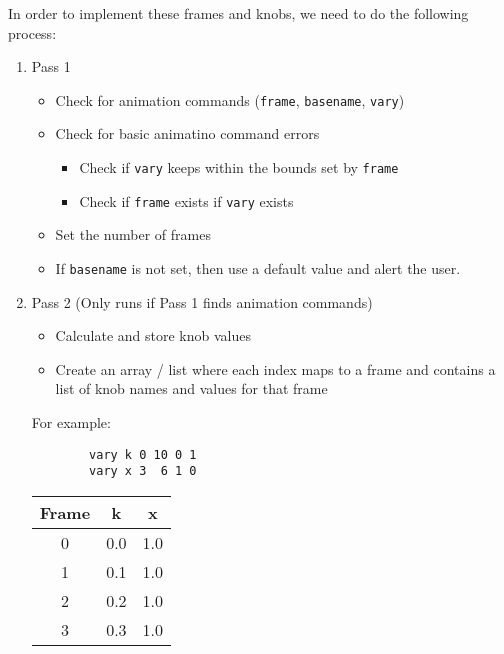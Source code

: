 \documentclass[11pt,fleqn]{article}
\theoremstyle{definition}
\begin{document}
In order to implement these frames and knobs, we need to do the following process:
\begin{enumerate}
    \item Pass 1
        \begin{itemize}
            \item Check for animation commands (\texttt{frame}, \texttt{basename},
                \texttt{vary})
            \item Check for basic animatino command errors
                \begin{itemize}
                    \item Check if \texttt{vary} keeps within the bounds set by
                        \texttt{frame}
                    \item Check if \texttt{frame} exists if \texttt{vary} exists
                \end{itemize}
            \item Set the number of frames
            \item If \texttt{basename} is not set, then use a default value and alert
                the user.
        \end{itemize}
    \item Pass 2 (Only runs if Pass 1 finds animation commands)
        \begin{itemize}
            \item Calculate and store knob values
            \item Create an array / list where each index maps to a frame and
                contains a list of knob names and values for that frame
        \end{itemize}
        For example:
        \begin{verbatim}
        vary k 0 10 0 1
        vary x 3  6 1 0
        \end{verbatim}
        \begin{table}[!htpb]
            \centering
            \begin{tabular}{|c|c|c|}
                \hline
                Frame & k & x \\
                \hline
                0 & 0.0 & 1.0 \\
                \hline
                1 & 0.1 & 1.0 \\
                \hline
                2 & 0.2 & 1.0 \\
                \hline
                3 & 0.3 & 1.0 \\
                \hline

\end{tabular}
\end{table}
\end{enumerate}
\end{document}

